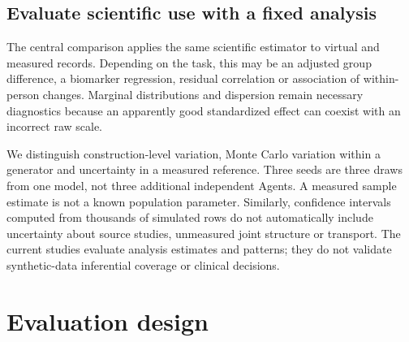 \documentclass[11pt,letterpaper]{article}
\begin{document}
\subsection{Evaluate scientific use with a fixed analysis}

The central comparison applies the same scientific estimator to virtual and measured records. Depending on the task, this may be an adjusted group difference, a biomarker regression, residual correlation or association of within-person changes. Marginal distributions and dispersion remain necessary diagnostics because an apparently good standardized effect can coexist with an incorrect raw scale.


We distinguish construction-level variation, Monte Carlo variation within a generator and uncertainty in a measured reference. Three seeds are three draws from one model, not three additional independent Agents. A measured sample estimate is not a known population parameter. Similarly, confidence intervals computed from thousands of simulated rows do not automatically include uncertainty about source studies, unmeasured joint structure or transport. The current studies evaluate analysis estimates and patterns; they do not validate synthetic-data inferential coverage or clinical decisions.



\section{Evaluation design}

\FloatBarrier

\begingroup

\small

\renewcommand{\arraystretch}{1.22}
\end{document}
